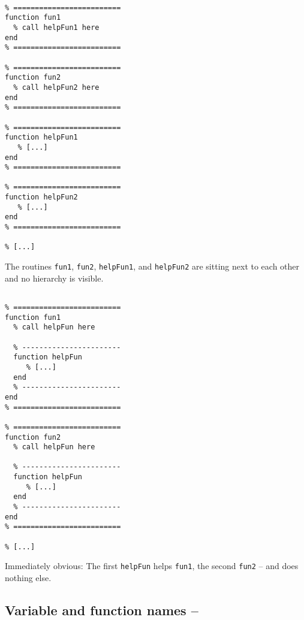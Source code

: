 \hfill
\begin{minipage}[t]{.45\textwidth}
\begin{lstlisting}[framerule=2pt,rulecolor=\color{badred}]
% [...]

% =========================
function fun1
  % call helpFun1 here
end
% =========================

% =========================
function fun2
  % call helpFun2 here
end
% =========================

% =========================
function helpFun1
   % [...]
end
% =========================

% =========================
function helpFun2
   % [...]
end
% =========================

% [...]
\end{lstlisting}
The routines \lstinline!fun1!, \lstinline!fun2!, \lstinline!helpFun1!, and \lstinline!helpFun2! are sitting next to each other and no hierarchy is visible.
\end{minipage}
\hfill
\begin{minipage}[t]{.45\textwidth}
\begin{lstlisting}[framerule=2pt,rulecolor=\color{goodgreen}]
% [...]

% =========================
function fun1
  % call helpFun here

  % -----------------------
  function helpFun
     % [...]
  end
  % -----------------------
end
% =========================

% =========================
function fun2
  % call helpFun here

  % -----------------------
  function helpFun
     % [...]
  end
  % -----------------------
end
% =========================

% [...]
\end{lstlisting}
Immediately obvious: The first \lstinline!helpFun! helps \lstinline!fun1!, the second \lstinline!fun2! -- and does nothing else.
\end{minipage}
\hfill

% 




\subsection{Variable and function names -- \cleansymbol\cleansymbol\cleansymbol}

